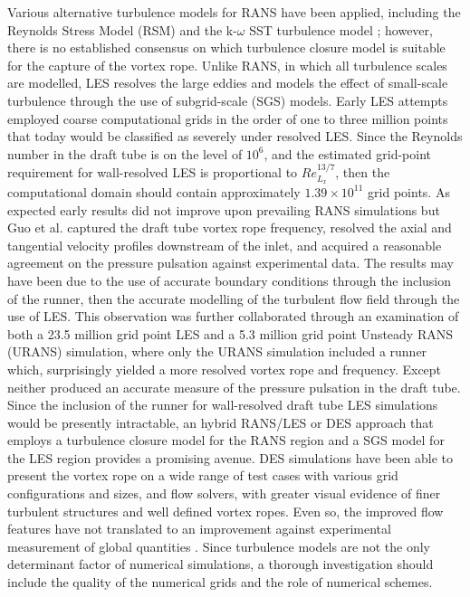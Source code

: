 Various alternative turbulence models for RANS have been applied, including the Reynolds Stress Model (RSM) \cite{sick2002cfd, stein2006numerical, jovst2009numerical, jovst2011numerical} and the k-$\omega$ SST turbulence model \cite{foroutan2012simulation, foroutan2014flow, krappel2014investigation}; however, there is no established consensus on which turbulence closure model is suitable for the capture of the vortex rope. Unlike RANS, in which all turbulence scales are modelled, LES resolves the large eddies and models the effect of small-scale turbulence through the use of subgrid-scale (SGS) models. Early LES attempts \cite{chen1995multi,skotak2000helical,guo2006large} employed coarse computational grids in the order of one to three million points that today would be classified as severely under resolved LES. Since the Reynolds number in the draft tube is on the level of $10^{6}$, and the estimated grid-point requirement for wall-resolved LES is proportional to $Re_{L_{x}}^{13/7}$, then the computational domain should contain approximately $1.39\times 10^{11}$ grid points. As expected early results \cite{chen1995multi,skotak2000helical} did not improve upon prevailing RANS simulations but Guo et al. \cite{guo2006large} captured the draft tube vortex rope frequency, resolved the axial and tangential velocity profiles downstream of the inlet, and acquired a reasonable agreement on the pressure pulsation against experimental data. The results may have been due to the use of accurate boundary conditions through the inclusion of the runner, then the accurate modelling of the turbulent flow field through the use of LES. This observation was further collaborated through an examination \cite{jovst2011numerical} of both a 23.5 million grid point LES and a 5.3 million grid point Unsteady RANS (URANS) simulation, where only the URANS simulation included a runner which, surprisingly yielded a more resolved vortex rope and frequency. Except neither produced an accurate measure of the pressure pulsation in the draft tube. Since the inclusion of the runner for wall-resolved draft tube LES simulations would be presently intractable, an hybrid RANS/LES or DES approach that employs a turbulence closure model for the RANS region and a SGS model for the LES region provides a promising avenue. DES simulations \cite{jovst2011numerical, krappel2014investigation} have been able to present the vortex rope on a wide range of test cases with various grid configurations and sizes, and flow solvers, with greater visual evidence of finer turbulent structures and well defined vortex ropes. Even so, the improved flow features have not translated to an improvement against experimental measurement of global quantities \cite{jovst2011numerical}.
Since turbulence models are not the only determinant factor of numerical simulations, a thorough investigation should include the quality of the numerical grids and the role of numerical schemes.

